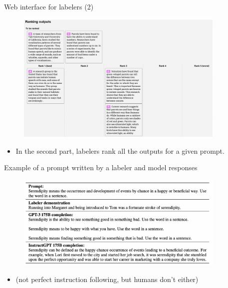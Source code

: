 \begin{vbframe}{Web interface for labelers (2)}

\vfill

\begin{figure}
\centering
\includegraphics[width = 10cm]{figure/webinterface2.png}
\end{figure}

\begin{itemize}
	\item In the second part, labelers rank all the outputs for a given prompt.
\end{itemize}

\vfill

\end{vbframe}


\begin{vbframe}{Example of a prompt written by a labeler and
model responses}

\vfill

\begin{figure}
\centering
\includegraphics[width = 10cm]{figure/labelerpromptexample.png}
\end{figure}

\begin{itemize}
	\item (not perfect instruction following, but humans
	don't either)
\end{itemize}


\vfill

\end{vbframe}

